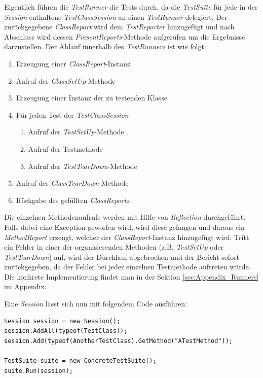 Eigentlich führen die \textit{TestRunner} die Tests durch, da die \textit{TestSuite} für jede in der \textit{Session} enthaltene \textit{TestClassSession} an einen \textit{TestRunner} delegiert. Der zurückgegebene \textit{ClassReport} wird dem \textit{TestReporter} hinzugefügt und nach Abschluss wird dessen \textit{PresentReports}-Methode aufgerufen um die Ergebnisse darzustellen. Der Ablauf innerhalb des \textit{TestRunners} ist wie folgt:
\begin{enumerate}
\item Erzeugung einer \textit{ClassReport}-Instanz
\item Aufruf der \textit{ClassSetUp}-Methode
\item Erzeugung einer Instanz der zu testenden Klasse
\item Für jeden Test der \textit{TestClassSession}
	\begin{enumerate}[label*=\arabic*.]
	\item Aufruf der \textit{TestSetUp}-Methode
	\item Aufruf der Testmethode
	\item Aufruf der \textit{TestTearDown}-Methode
	\end{enumerate}
\item Aufruf der \textit{ClassTearDown}-Methode
\item Rückgabe des gefüllten \textit{ClassReports}
\end{enumerate}

Die einzelnen Methodenaufrufe werden mit Hilfe von \textit{Reflection} durchgeführt. Falls dabei eine Exception geworfen wird, wird diese gefangen und daraus ein \textit{MethodReport} erzeugt, welcher der \textit{ClassReport}-Instanz hinzugefügt wird. Tritt ein Fehler in einer der organisierenden Methoden (z.B. \textit{TestSetUp} oder \textit{TestTearDown}) auf, wird der Durchlauf abgebrochen und der Bericht sofort zurückgegeben, da der Fehler bei jeder einzelnen Testmethode auftreten würde. Die konkrete Implementierung findet man in der Sektion \ref{sec:Appendix_Runners}  im Appendix.

Eine \textit{Session} lässt sich nun mit folgendem Code ausführen:
\begin{lstlisting}[caption={[Beispiel für die Ausführung einer \textit{Session}]Beispiel für die Ausführung einer \textit{Session}\\\textit{ConcreteTestSuite} ist stellvertretend für eine beliebige Implementierung von \textit{AbstractTestSuite}.}, label=code:Example_SessionCreation]
Session session = new Session();
session.AddAll(typeof(TestClass));
session.Add(typeof(AnotherTestClass).GetMethod("ATestMethod"));

TestSuite suite = new ConcreteTestSuite();
suite.Run(session);
\end{lstlisting}
\clearpage

